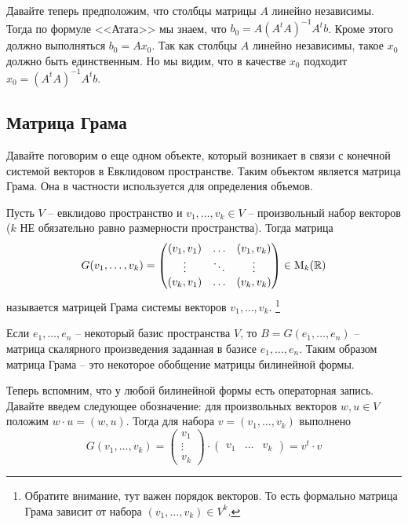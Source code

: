 Давайте теперь предположим, что столбцы матрицы $A$ линейно независимы.
Тогда по формуле <<Атата>> мы знаем, что $b_0 = A(A^tA)^{-1}A^tb$.
Кроме этого должно выполняться $b_0 = Ax_0$.
Так как столбцы $A$ линейно независимы, такое $x_0$ должно быть единственным.
Но мы видим, что в качестве $x_0$ подходит $x_0 = (A^tA)^{-1}A^tb$.


\subsection{Матрица Грама}
\label{subsection::Gram}

Давайте поговорим о еще одном объекте, который возникает в связи с конечной системой векторов в Евклидовом пространстве.
Таким объектом является матрица Грама.
Она в частности используется для определения объемов.

\begin{definition}
Пусть $V$ -- евклидово пространство и $v_1,\ldots,v_k\in V$ -- произвольный набор векторов ($k$ НЕ обязательно равно размерности пространства).
Тогда матрица
\[
G(v_1,\ldots,v_k) =
\begin{pmatrix}
{(v_1,v_1)}&{\ldots}&{(v_1,v_k)}\\
{\vdots}&{\ddots}&{\vdots}\\
{(v_k,v_1)}&{\ldots}&{(v_k,v_k)}\\
\end{pmatrix}
\in\operatorname{M}_{k}(\mathbb R)
\]
называется матрицей Грама системы векторов $v_1,\ldots,v_k$.%
\footnote{Обратите внимание, тут важен порядок векторов.
То есть формально матрица Грама зависит от набора $(v_1,\ldots,v_k)\in V^k$.}
\end{definition}

Если $e_1,\ldots,e_n$ -- некоторый базис пространства $V$, то $B = G(e_1,\ldots,e_n)$ -- матрица скалярного произведения заданная в базисе $e_1,\ldots,e_n$.
Таким образом матрица Грама -- это некоторое обобщение матрицы билинейной формы.

Теперь вспомним, что у любой билинейной формы есть операторная запись.
Давайте введем следующее обозначение: для произвольных векторов $w, u\in V$ положим $w\cdot u = (w, u)$.
Тогда для набора $v = (v_1,\ldots,v_k)$ выполнено
\[
G(v_1,\ldots,v_k) = 
\begin{pmatrix}
{v_1}\\{\vdots}\\{v_k}
\end{pmatrix}
\cdot
\begin{pmatrix}
{v_1}&{\ldots}&{v_k}
\end{pmatrix}
=
v^t \cdot v
\]

